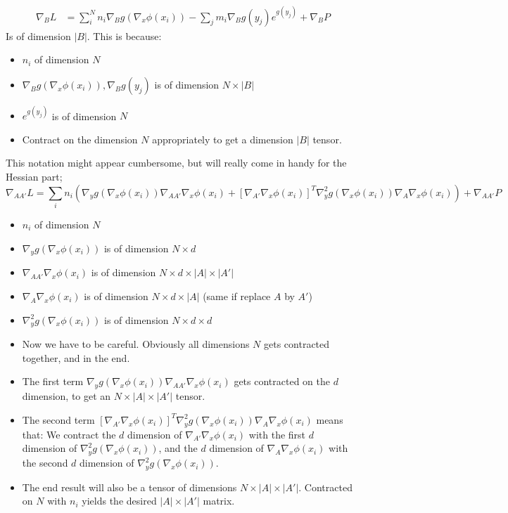 \documentclass{article}
\theoremstyle{definition}
\theoremstyle{remark}
\newcommand{\1}{\mathbbm{1}}
\begin{document}
\begin{align*}
\nabla_{B} L &= \sum_i^N n_i \nabla_{B} g(\nabla_x \phi(x_i)) - \sum_j m_i \nabla_{B} g(y_j) e^{g(y_j)} + \nabla_{B} P
\end{align*}
Is of dimension $|B|$. This is because:
\begin{itemize}
\item  $n_i$ of dimension $N$
\item  $\nabla_{B} g(\nabla_x \phi(x_i)),\nabla_{B} g(y_j)$ is of dimension $N \times |B|$
\item $e^{g(y_j)}$ is of dimension $N$
\item Contract on the dimension $N$ appropriately to get a dimension $|B|$ tensor.
\end{itemize}
This notation might appear cumbersome, but will really come in handy for the Hessian part;
\[
\nabla_{A A'} L = \sum_i n_i \left( \nabla_y g(\nabla_x \phi(x_i))  \nabla_{A A'} \nabla_x \phi(x_i) + [\nabla_{A'} \nabla_x \phi(x_i)]^T \nabla_y^2 g (\nabla_x \phi(x_i)) \nabla_{A} \nabla_x \phi(x_i) \right)+ \nabla_{A A'} P
\]
\begin{itemize}
\item  $n_i$ of dimension $N$
\item  $\nabla_y g(\nabla_x \phi(x_i))$ is of dimension $N \times d$
\item $\nabla_{A A'} \nabla_x \phi(x_i)$ is of dimension $N \times d \times |A| \times |A'|$
\item $\nabla_{A} \nabla_x \phi(x_i)$ is of dimension $N \times d \times |A|$ (same if replace $A$ by $A'$)
\item $\nabla_y^2 g (\nabla_x \phi(x_i))$ is of dimension $N \times d \times d$
\item Now we have to be careful. Obviously all dimensions $N$ gets contracted together, and in the end. 
\item The first term $\nabla_y g(\nabla_x \phi(x_i))  \nabla_{A A'} \nabla_x \phi(x_i)$ gets contracted on the $d$ dimension, to get an $N \times |A| \times |A'|$ tensor. 
\item The second term $[\nabla_{A'} \nabla_x \phi(x_i)]^T \nabla_y^2 g (\nabla_x \phi(x_i)) \nabla_{A} \nabla_x \phi(x_i)$ means that: We contract the $d$ dimension of $\nabla_{A'} \nabla_x \phi(x_i)$ with the first $d$ dimension of $\nabla_y^2 g (\nabla_x \phi(x_i))$, and the $d$ dimension of $\nabla_{A} \nabla_x \phi(x_i)$ with the second $d$ dimension of $\nabla_y^2 g (\nabla_x \phi(x_i))$. \item The end result will also be a tensor of dimensions $N \times |A| \times |A'|$. Contracted on $N$ with $n_i$ yields the desired $|A| \times |A'|$ matrix. 
\end{itemize}
\end{document}
